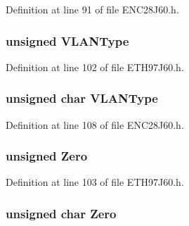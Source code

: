 Definition at line 91 of file E\+N\+C28\+J60.\+h.

\hypertarget{union_r_x_s_t_a_t_u_s_a22cd5e080a1a75dd534af479194c6b15}{}
\subsubsection[{V\+L\+A\+N\+Type}]{\setlength{\rightskip}{0pt plus 5cm}unsigned V\+L\+A\+N\+Type}\label{union_r_x_s_t_a_t_u_s_a22cd5e080a1a75dd534af479194c6b15}


Definition at line 102 of file E\+T\+H97\+J60.\+h.

\hypertarget{union_r_x_s_t_a_t_u_s_ac5135b9b1ebdce4de0dce57ce1dd1179}{}
\subsubsection[{V\+L\+A\+N\+Type}]{\setlength{\rightskip}{0pt plus 5cm}unsigned char V\+L\+A\+N\+Type}\label{union_r_x_s_t_a_t_u_s_ac5135b9b1ebdce4de0dce57ce1dd1179}


Definition at line 108 of file E\+N\+C28\+J60.\+h.

\hypertarget{union_r_x_s_t_a_t_u_s_a9c9673acd10107bc9eca4072dc56475a}{}
\subsubsection[{Zero}]{\setlength{\rightskip}{0pt plus 5cm}unsigned Zero}\label{union_r_x_s_t_a_t_u_s_a9c9673acd10107bc9eca4072dc56475a}


Definition at line 103 of file E\+T\+H97\+J60.\+h.

\hypertarget{union_r_x_s_t_a_t_u_s_a5c0afa712606f81bc94d8585e3cfda58}{}
\subsubsection[{Zero}]{\setlength{\rightskip}{0pt plus 5cm}unsigned char Zero}\label{union_r_x_s_t_a_t_u_s_a5c0afa712606f81bc94d8585e3cfda58}


